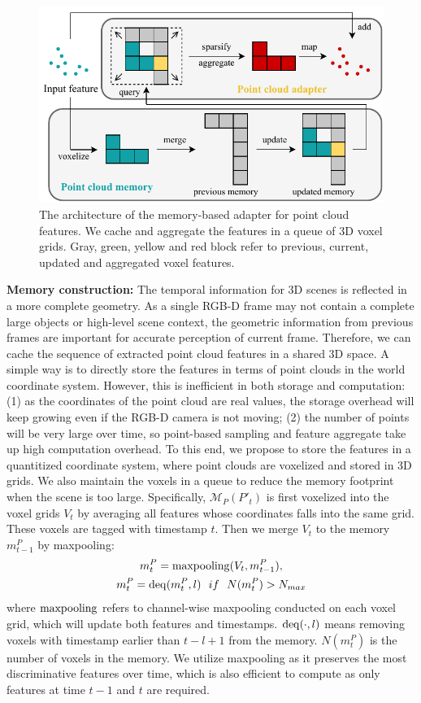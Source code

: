 \begin{figure}[t]
    \centering
    \includegraphics[width=1.0\linewidth]{figures/pc-module-single.pdf}
    \caption{The architecture of the memory-based adapter for point cloud features. We cache and aggregate the features in a queue of 3D voxel grids. Gray, green, yellow and red block refer to previous, current, updated and aggregated voxel features.}
    \label{point-module}
\end{figure}

\textbf{Memory construction:}
The temporal information for 3D scenes is reflected in a more complete geometry. As a single RGB-D frame may not contain a complete large objects or high-level scene context, the geometric information from previous frames are important for accurate perception of current frame. Therefore, we can cache the sequence of extracted point cloud features in a shared 3D space. A simple way is to directly store the features in terms of point clouds in the world coordinate system. However, this is inefficient in both storage and computation: (1) as the coordinates of the point cloud are real values, the storage overhead will keep growing even if the RGB-D camera is not moving; (2) the number of points will be very large over time, so point-based sampling and feature aggregate take up high computation overhead.
To this end, we propose to store the features in a quantitized coordinate system, where point clouds are voxelized and stored in 3D grids. We also maintain the voxels in a queue to reduce the memory footprint when the scene is too large.
Specifically, $\mathcal{M}_{P}(P'_t)$ is first voxelized into the voxel grids $V_t$ by averaging all features whose coordinates falls into the same grid. These voxels are tagged with timestamp $t$. Then we merge $V_t$ to the memory $m^P_{t-1}$ by maxpooling:
\begin{gather}
    m^P_{t}={\rm maxpooling}(V_t,m^P_{t-1}), \nonumber \\
    m^P_{t}={\rm deq}(m^P_{t}, l)\ \ if\ \ N(m^P_{t})>N_{max}
\end{gather}
where ${\rm maxpooling}$ refers to channel-wise maxpooling conducted on each voxel grid, which will update both features and timestamps. ${\rm deq}(\cdot,l)$ means removing voxels with timestamp earlier than $t-l+1$ from the memory. $N(m^P_{t})$ is the number of voxels in the memory.
We utilize maxpooling as it preserves the most discriminative features over time, which is also efficient to compute as only features at time $t-1$ and $t$ are required.


